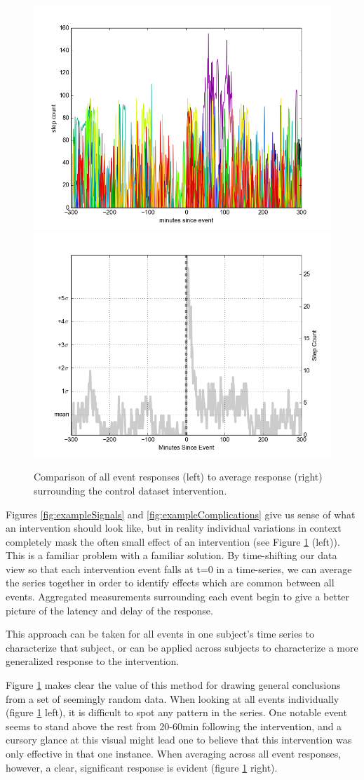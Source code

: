 \documentclass[review,journal]{vgtc}         %
\begin{document}
\begin{figure}
\centering
\includegraphics[width=0.45\columnwidth]{./img/perfect_intervention_individual_events.png}
\includegraphics[width=0.45\columnwidth]{./img/perfect_intervention.png}
\caption{Comparison of all event responses (left) to average response (right) surrounding the control dataset intervention.}
\label{fig:interventionAverage}
\end{figure}

Figures \ref{fig:exampleSignals} and \ref{fig:exampleComplications} give us sense of what an intervention should look like, but in reality individual variations in context completely mask the often small effect of an intervention (see Figure \ref{fig:interventionAverage} (left)).
This is a familiar problem with a familiar solution.
By time-shifting our data view so that each intervention event falls at t=0 in a time-series, we can average the series together in order to identify effects which are common between all events.
Aggregated measurements surrounding each event begin to give a better picture of the latency and delay of the response.

This approach can be taken for all events in one subject's time series to characterize that subject, or can be applied across subjects to characterize a more generalized response to the intervention.


Figure \ref{fig:interventionAverage} makes clear the value of this method for drawing general conclusions from a set of seemingly random data.
When looking at all events individually (figure \ref{fig:interventionAverage} left), it is difficult to spot any pattern in the series.
One notable event seems to stand above the rest from 20-60min following the intervention, and a cursory glance at this visual might lead one to believe that this intervention was only effective in that one instance.
When averaging across all event responses, however, a clear, significant response is evident (figure \ref{fig:interventionAverage} right).
\end{document}
